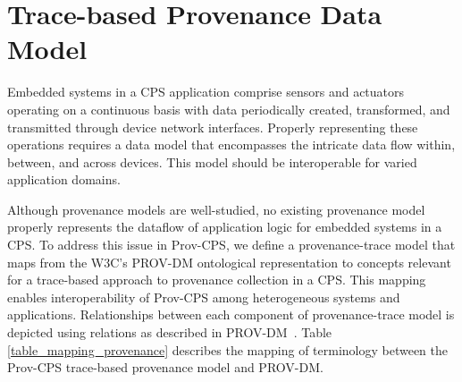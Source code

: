 \section{Trace-based Provenance Data Model} \label{prov_sensor_model}

Embedded systems in a CPS application comprise sensors and actuators operating on a continuous basis with data periodically created, transformed, and transmitted through device network interfaces. Properly representing these operations requires a data model that encompasses the intricate data flow within, between, and across devices. This model should be interoperable for varied application domains. 


\begin{table}[t] \centering 
\caption{Concept mapping from trace-based provenance to PROV-DM.}
\label{table_mapping_provenance}
\end{table}


Although provenance models are well-studied, no existing provenance model properly represents the dataflow of application logic for embedded systems in a CPS. To address this issue in Prov-CPS, we define a provenance-trace model that maps from the W3C's PROV-DM ontological representation to concepts relevant for a trace-based approach to provenance collection in a CPS. This mapping enables interoperability of Prov-CPS among heterogeneous systems and applications. 
Relationships between each component of provenance-trace model is depicted using relations as described in PROV-DM~\cite{prov_dm}. Table \ref{table_mapping_provenance} describes the mapping of terminology between the Prov-CPS trace-based provenance model and PROV-DM. 

